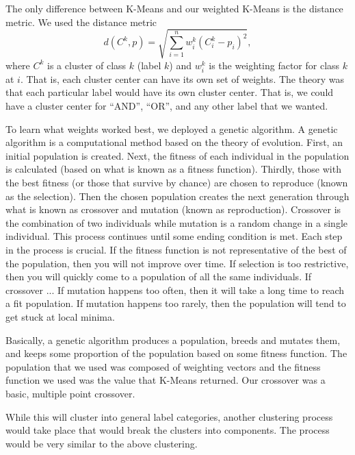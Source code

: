 The only difference between K-Means and our weighted K-Means is the distance metric.
We used the distance metric
$$
d(C^k, p) = \sqrt{\sum_{i=1}^{n} w_i^k (C_i^k - p_i)^2},
$$
where $C^k$ is a cluster of class $k$ (label $k$) and $w_i^k$ is the weighting factor for class $k$ at $i$.
That is, each cluster center can have its own set of weights.
The theory was that each particular label would have its own cluster center.
That is, we could have a cluster center for ``AND'', ``OR'', and any other label that we wanted.

To learn what weights worked best, we deployed a genetic algorithm.
A genetic algorithm is a computational method based on the theory of evolution.
First, an initial population is created.
Next, the fitness of each individual in the population is calculated (based on what is known as a fitness function).
Thirdly, those with the best fitness (or those that survive by chance) are chosen to reproduce (known as the selection).
Then the chosen population creates the next generation through what is known as crossover and mutation (known as reproduction).
Crossover is the combination of two individuals while mutation is a random change in a single individual.
This process continues until some ending condition is met.
Each step in the process is crucial.
If the fitness function is not representative of the best of the population, then you will not improve over time.
If selection is too restrictive, then you will quickly come to a population of all the same individuals.
If crossover ...
If mutation happens too often, then it will take a long time to reach a fit population.
If mutation happens too rarely, then the population will tend to get stuck at local minima.

Basically, a genetic algorithm produces a population, breeds and mutates them, and keeps some proportion of the population based on some fitness function.
The population that we used was composed of weighting vectors and the fitness function we used was the value that K-Means returned.
Our crossover was a basic, multiple point crossover.

While this will cluster into general label categories, another clustering process would take place that would break the clusters into components. 
The process would be very similar to the above clustering.




